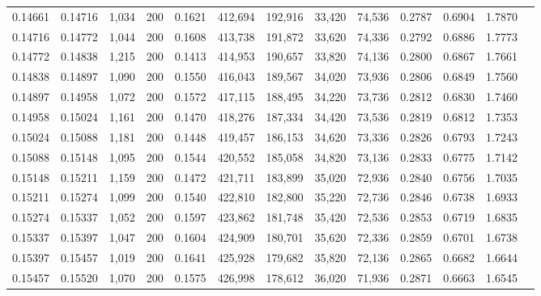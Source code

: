 \begin{tabular}{rrrrrrrrrrrrr}
0.14661 & 0.14716 &  1,034 & 200 &                                     0.1621 & 412,694 & 192,916 &  33,420 &  74,536 & 0.2787 & 0.6904 & 1.7870 \\
0.14716 & 0.14772 &  1,044 & 200 &                                     0.1608 & 413,738 & 191,872 &  33,620 &  74,336 & 0.2792 & 0.6886 & 1.7773 \\
0.14772 & 0.14838 &  1,215 & 200 &                                     0.1413 & 414,953 & 190,657 &  33,820 &  74,136 & 0.2800 & 0.6867 & 1.7661 \\
0.14838 & 0.14897 &  1,090 & 200 &                                     0.1550 & 416,043 & 189,567 &  34,020 &  73,936 & 0.2806 & 0.6849 & 1.7560 \\
0.14897 & 0.14958 &  1,072 & 200 &                                     0.1572 & 417,115 & 188,495 &  34,220 &  73,736 & 0.2812 & 0.6830 & 1.7460 \\
0.14958 & 0.15024 &  1,161 & 200 &                                     0.1470 & 418,276 & 187,334 &  34,420 &  73,536 & 0.2819 & 0.6812 & 1.7353 \\
0.15024 & 0.15088 &  1,181 & 200 &                                     0.1448 & 419,457 & 186,153 &  34,620 &  73,336 & 0.2826 & 0.6793 & 1.7243 \\
0.15088 & 0.15148 &  1,095 & 200 &                                     0.1544 & 420,552 & 185,058 &  34,820 &  73,136 & 0.2833 & 0.6775 & 1.7142 \\
0.15148 & 0.15211 &  1,159 & 200 &                                     0.1472 & 421,711 & 183,899 &  35,020 &  72,936 & 0.2840 & 0.6756 & 1.7035 \\
0.15211 & 0.15274 &  1,099 & 200 &                                     0.1540 & 422,810 & 182,800 &  35,220 &  72,736 & 0.2846 & 0.6738 & 1.6933 \\
0.15274 & 0.15337 &  1,052 & 200 &                                     0.1597 & 423,862 & 181,748 &  35,420 &  72,536 & 0.2853 & 0.6719 & 1.6835 \\
0.15337 & 0.15397 &  1,047 & 200 &                                     0.1604 & 424,909 & 180,701 &  35,620 &  72,336 & 0.2859 & 0.6701 & 1.6738 \\
0.15397 & 0.15457 &  1,019 & 200 &                                     0.1641 & 425,928 & 179,682 &  35,820 &  72,136 & 0.2865 & 0.6682 & 1.6644 \\
0.15457 & 0.15520 &  1,070 & 200 &                                     0.1575 & 426,998 & 178,612 &  36,020 &  71,936 & 0.2871 & 0.6663 & 1.6545 \\

\end{tabular}
